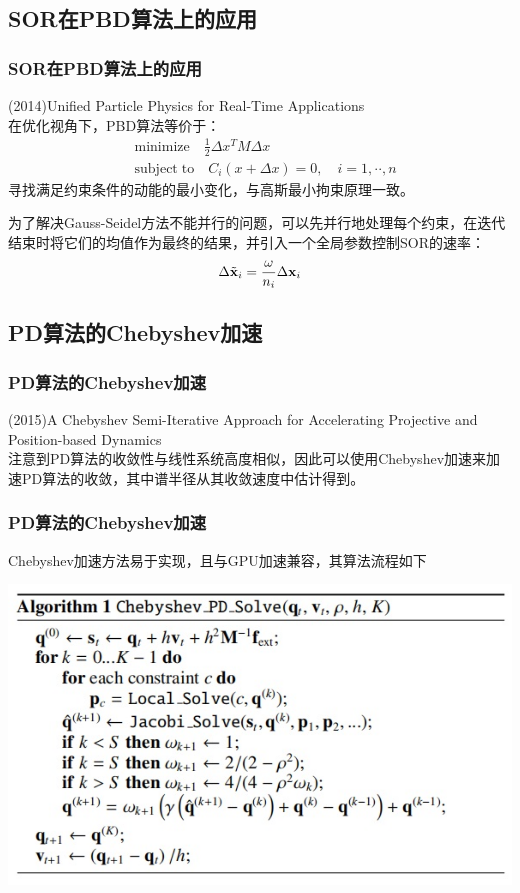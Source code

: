 \documentclass[aspectratio=43]{ctexbeamer}
\begin{document}
\subsection{SOR在PBD算法上的应用}
\begin{frame}
  \frametitle{SOR在PBD算法上的应用}
	(2014)Unified Particle Physics for Real-Time Applications\\[10pt]

		在优化视角下，PBD算法等价于：
		\begin{equation}
		\begin{split}
			&\mathrm{minimize}\quad \frac{1}{2}\Delta x^{T}M\Delta x\\ 
			&\mathrm{subject\;to}\quad C_{i}(x+ \Delta x)=0,\quad i=1,\cdot\cdot,n			
		\end{split}
		\end{equation}
		寻找满足约束条件的动能的最小变化，与高斯最小拘束原理一致。

		为了解决Gauss-Seidel方法不能并行的问题，可以先并行地处理每个约束，在迭代结束时将它们的均值作为最终的结果，并引入一个全局参数控制SOR的速率：
       \begin{equation}
			\Delta\tilde{\bf x}_{i}=\frac{\omega}{n_{i}}\Delta{\bf x}_{i}
		\end{equation}

\end{frame}

\subsection{PD算法的Chebyshev加速}
\begin{frame}
  \frametitle{PD算法的Chebyshev加速}
	(2015)A Chebyshev Semi-Iterative Approach for Accelerating Projective and Position-based Dynamics\\[10pt]

		注意到PD算法的收敛性与线性系统高度相似，因此可以使用Chebyshev加速来加速PD算法的收敛，其中谱半径从其收敛速度中估计得到。
\end{frame}

\begin{frame}
  \frametitle{PD算法的Chebyshev加速}
		Chebyshev加速方法易于实现，且与GPU加速兼容，其算法流程如下
        \begin{center}
            \includegraphics[width=0.7\linewidth]{./fig/chebyshev.jpg}
        \end{center}
\end{frame}
\end{document}
